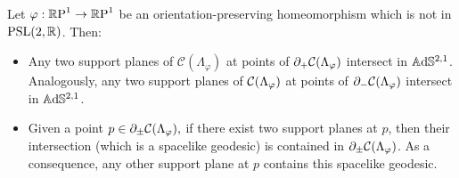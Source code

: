 \begin{lemma}\label{condor}
    Let $\varphi:\S\to\S$ be an orientation-preserving homeomorphism which is not in $\PSL$. Then: 
    \begin{itemize}
        \item Any two support planes of $\mathcal{C}(\Lambda_\varphi)$ at points of $\partial_+\CF$ intersect in $\A^{2,1}$. Analogously, any two support planes of $\CF$ at points of $\partial_-\CF$ intersect in $\A^{2,1}$.
        \item Given a point $p\in\partial_\pm\CF,$ if there exist two support planes at $p$, then their intersection (which is a spacelike geodesic) is contained in $\partial_\pm\CF$. As a consequence, any other support plane at $p$ contains this spacelike geodesic.
    \end{itemize}
\end{lemma}

